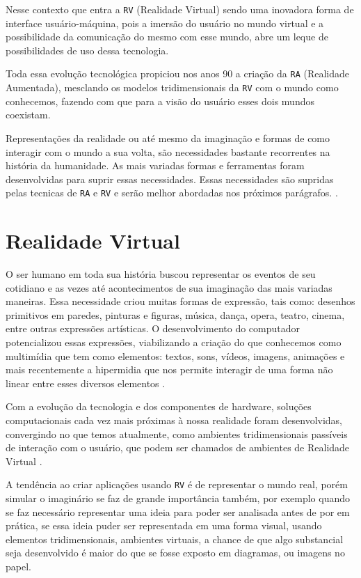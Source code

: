 Nesse contexto que entra a \verb'RV' (Realidade Virtual) sendo uma inovadora forma de interface usuário-máquina, pois a imersão do usuário no mundo virtual e a possibilidade da comunicação do mesmo com esse mundo, abre um leque de possibilidades de uso dessa tecnologia.

Toda essa evolução tecnológica propiciou nos anos 90 a criação da \verb'RA' (Realidade Aumentada), mesclando os modelos tridimensionais da \verb'RV' com o mundo como conhecemos, fazendo com que para a visão do usuário esses dois mundos coexistam.

Representações da realidade ou até mesmo da imaginação e formas de como interagir com o mundo a sua volta, são necessidades bastante recorrentes na história da humanidade. As mais variadas formas e ferramentas foram desenvolvidas para suprir essas necessidades. Essas necessidades são supridas pelas tecnicas de \verb'RA' e \verb'RV' e serão melhor abordadas nos próximos parágrafos. \cite{kirner2007,kirner2006}.

\section {Realidade Virtual}
O ser humano em toda sua história buscou representar os eventos de seu cotidiano e as vezes até acontecimentos de sua imaginação das mais variadas maneiras. Essa necessidade criou muitas formas de expressão, tais como: desenhos primitivos em paredes, pinturas e figuras, música, dança, opera, teatro, cinema, entre outras expressões artísticas. O desenvolvimento do computador potencializou essas expressões, viabilizando a criação do que conhecemos como multimídia que tem como elementos: textos, sons, vídeos, imagens, animações e mais recentemente a hipermidia que nos permite interagir de uma forma não linear entre esses diversos elementos \cite{kirner2006}.

Com a evolução da tecnologia e dos componentes de hardware, soluções computacionais cada vez mais próximas à nossa realidade foram desenvolvidas, convergindo no que temos atualmente, como ambientes tridimensionais passíveis de interação com o usuário, que podem ser chamados de ambientes de Realidade Virtual \cite{kirner2006}.

A tendência ao criar aplicações usando \verb'RV' é de representar o mundo real, porém simular o imaginário se faz de grande importância também, por exemplo quando se faz necessário representar uma ideia para poder ser analisada antes de por em prática, se essa ideia puder ser representada em uma forma visual, usando elementos tridimensionais, ambientes virtuais, a chance de que algo substancial seja desenvolvido é maior do que se fosse exposto em diagramas, ou imagens no papel.

